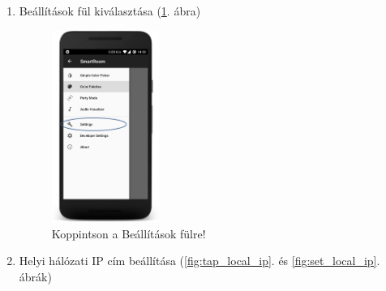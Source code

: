 \documentclass[../main.tex]{subfiles}
\begin{document}
\begin{enumerate}
                \item Beállítások fül kiválasztása (\ref{fig:tap_settigs}. ábra)
                    \begin{figure}[h!]
                        \includegraphics[width=3.5cm]{android_res/screen_pictures/tap_settings_menu}
                        \caption{Koppintson a Beállítások fülre!}
                        \label{fig:tap_settigs}
                    \end{figure}
                    
                \item Helyi hálózati IP cím beállítása (\ref{fig:tap_local_ip}. és \ref{fig:set_local_ip}. ábrák)
                    \begin{figure}[h!]
                        \begin{floatrow}
                        \end{floatrow}
                    \end{figure}
                

\end{enumerate}
\end{document}
